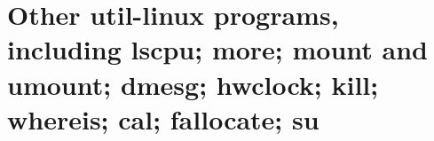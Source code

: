 
\chapter{Other util-linux programs, including lscpu; more; mount and umount; dmesg; hwclock; kill; whereis; cal; fallocate; su}


